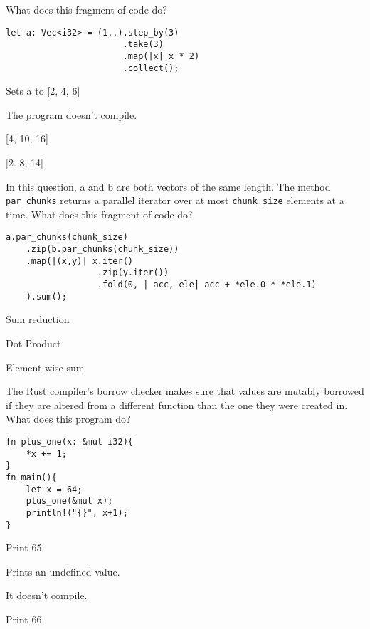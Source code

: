 \documentclass[11pt]{article} %
\newcommand*\choice{\item}
\begin{document}
\begin{multiplechoice}[choices=1]
What does this fragment of code do?

\begin{lstlisting}
let a: Vec<i32> = (1..).step_by(3)
                       .take(3)
                       .map(|x| x * 2)
                       .collect();
\end{lstlisting}

  \choice Sets a to {[2, 4, 6]}
  \choice The program doesn't compile.
  \choice {[4, 10, 16]}
  \choice {[2. 8, 14]}
\end{multiplechoice}

\begin{multiplechoice}[choices=1]
In this question, a and b are both vectors of the same length. The method \texttt{par\_chunks} returns a parallel iterator over at most \texttt{chunk\_size} elements at a time. What does this fragment of code do?
\begin{lstlisting}
a.par_chunks(chunk_size)
    .zip(b.par_chunks(chunk_size))
    .map(|(x,y)| x.iter()
                  .zip(y.iter())
                  .fold(0, | acc, ele| acc + *ele.0 * *ele.1)
    ).sum();

\end{lstlisting}

\choice Sum reduction
\choice Dot Product
\choice Element wise sum


\end{multiplechoice}
\begin{multiplechoice}[choices=1]
The Rust compiler's borrow checker makes sure that values are mutably borrowed if they are altered from a different function than the one they were created in. What does this program do?
\begin{lstlisting}
fn plus_one(x: &mut i32){
    *x += 1;
}
fn main(){
    let x = 64;
    plus_one(&mut x);
    println!("{}", x+1);
}
\end{lstlisting}
  \choice Print 65.
  \choice Prints an undefined value.
  \choice It doesn't compile.
  \choice Print 66.
\end{multiplechoice}
\pagebreak
\end{document}

